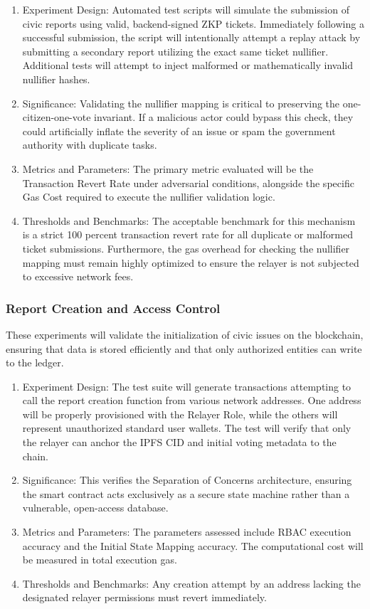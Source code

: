 \begin{enumerate}
    \item Experiment Design: Automated test scripts will simulate the submission of civic reports using valid, backend-signed \ac{ZKP} tickets. Immediately following a successful submission, the script will intentionally attempt a replay attack by submitting a secondary report utilizing the exact same ticket nullifier. Additional tests will attempt to inject malformed or mathematically invalid nullifier hashes.
    \item Significance: Validating the nullifier mapping is critical to preserving the one-citizen-one-vote invariant. If a malicious actor could bypass this check, they could artificially inflate the severity of an issue or spam the government authority with duplicate tasks.
    \item Metrics and Parameters: The primary metric evaluated will be the Transaction Revert Rate under adversarial conditions, alongside the specific Gas Cost required to execute the nullifier validation logic.
    \item Thresholds and Benchmarks: The acceptable benchmark for this mechanism is a strict 100 percent transaction revert rate for all duplicate or malformed ticket submissions. Furthermore, the gas overhead for checking the nullifier mapping must remain highly optimized to ensure the relayer is not subjected to excessive network fees.
\end{enumerate}

\subsubsection{Report Creation and Access Control}
These experiments will validate the initialization of civic issues on the blockchain, ensuring that data is stored efficiently and that only authorized entities can write to the ledger.

\begin{enumerate}
    \item Experiment Design: The test suite will generate transactions attempting to call the report creation function from various network addresses. One address will be properly provisioned with the Relayer Role, while the others will represent unauthorized standard user wallets. The test will verify that only the relayer can anchor the IPFS \ac{CID} and initial voting metadata to the chain.
    \item Significance: This verifies the Separation of Concerns architecture, ensuring the smart contract acts exclusively as a secure state machine rather than a vulnerable, open-access database.
    \item Metrics and Parameters: The parameters assessed include \ac{RBAC} execution accuracy and the Initial State Mapping accuracy. The computational cost will be measured in total execution gas.
    \item Thresholds and Benchmarks: Any creation attempt by an address lacking the designated relayer permissions must revert immediately.
\end{enumerate}

